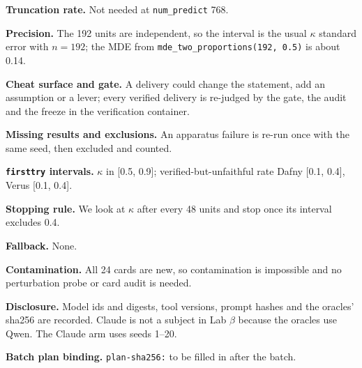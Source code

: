 \documentclass[11pt]{article}
\begin{document}
\begin{answer}
\textbf{Truncation rate.} Not needed at \texttt{num\_predict} 768.

\textbf{Precision.} The 192 units are independent, so the interval is the
usual $\kappa$ standard error with $n = 192$; the MDE from
\texttt{mde\_two\_proportions(192, 0.5)} is about 0.14.

\textbf{Cheat surface and gate.} A delivery could change the statement, add an
assumption or a lever; every verified delivery is re-judged by the gate, the
audit and the freeze in the verification container.

\textbf{Missing results and exclusions.} An apparatus failure is re-run once
with the same seed, then excluded and counted.

\textbf{\texttt{firsttry} intervals.} $\kappa$ in [0.5, 0.9]; verified-but-unfaithful
rate Dafny [0.1, 0.4], Verus [0.1, 0.4].

\textbf{Stopping rule.} We look at $\kappa$ after every 48 units and stop once
its interval excludes 0.4.

\textbf{Fallback.} None.

\textbf{Contamination.} All 24 cards are new, so contamination is impossible
and no perturbation probe or card audit is needed.

\textbf{Disclosure.} Model ids and digests, tool versions, prompt hashes and the
oracles' sha256 are recorded. Claude is not a
subject in Lab $\beta$ because the oracles use Qwen. The Claude arm uses seeds
1--20.

\textbf{Batch plan binding.} \texttt{plan-sha256:} to be filled in after the
batch.
\end{answer}
\end{document}
